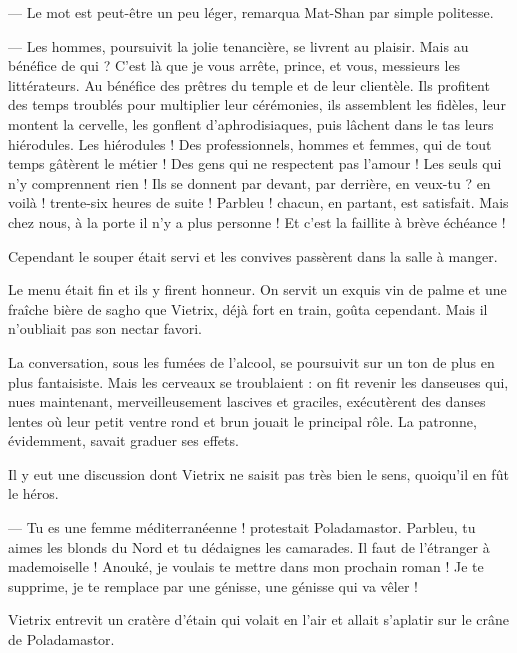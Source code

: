 \documentclass[a4paper, 11pt, oneside, polutonikogreek, french]{article}
\begin{document}
--- Le mot est peut-être un peu léger, remarqua Mat-Shan par simple politesse.

--- Les hommes, poursuivit la jolie tenancière, se livrent au plaisir. Mais au bénéfice de qui ? C'est là que je vous arrête, prince, et vous, messieurs les littérateurs. Au bénéfice des prêtres du temple et de leur clientèle. Ils profitent des temps troublés pour multiplier leur cérémonies, ils assemblent les fidèles, leur montent la cervelle, les gonflent d'aphrodisiaques, puis lâchent dans le tas leurs hiérodules. Les hiérodules ! Des professionnels, hommes et femmes, qui de tout temps gâtèrent le métier ! Des gens qui ne respectent pas l'amour ! Les seuls qui n'y comprennent rien ! Ils se donnent par devant, par derrière, en veux-tu ? en voilà ! trente-six heures de suite ! Parbleu ! chacun, en partant, est satisfait. Mais chez nous, à la porte il n'y a plus personne ! Et c'est la faillite à brève échéance !

\bigskip
\centerline{\EightStarTaper}
\centerline{\EightStarTaper\EightStarTaper}
\bigskip

Cependant le souper était servi et les convives passèrent dans la salle à manger.

Le menu était fin et ils y firent honneur. On servit un exquis vin de palme et une fraîche bière de sagho que Vietrix, déjà fort en train, goûta cependant. Mais il n'oubliait pas son nectar favori.

La conversation, sous les fumées de l'alcool, se poursuivit sur un ton de plus en plus fantaisiste. Mais les cerveaux se troublaient : on fit revenir les danseuses qui, nues maintenant, merveilleusement lascives et graciles, exécutèrent des danses lentes où leur petit ventre rond et brun jouait le principal rôle. La patronne, évidemment, savait graduer ses effets.

Il y eut une discussion dont Vietrix ne saisit pas très bien le sens, quoiqu'il en fût le héros.

--- Tu es une femme méditerranéenne ! protestait Poladamastor. Parbleu, tu aimes les blonds du Nord et tu dédaignes les camarades. Il faut de l'étranger à mademoiselle ! Anouké, je voulais te mettre dans mon prochain roman ! Je te supprime, je te remplace par une génisse, une génisse qui va vêler !

Vietrix entrevit un cratère d'étain qui volait en l'air et allait s'aplatir sur le crâne de Poladamastor.

\bigskip
\centerline{\EightStarTaper}
\centerline{\EightStarTaper\EightStarTaper}
\bigskip
\end{document}
